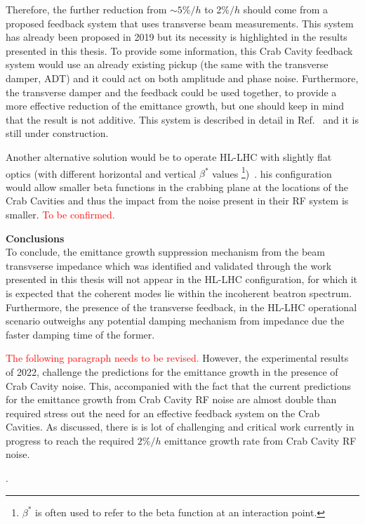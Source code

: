 Therefore, the further reduction from $\sim 5\%/h$ to 2$\%/h$ should come from a proposed feedback system that uses transverse beam measurements. This system has already been proposed in 2019 but its necessity is highlighted in the results presented in this thesis. To provide some information, this Crab Cavity feedback system would use an already existing pickup (the same with the transverse damper, ADT) and it could act on both amplitude and phase noise.  Furthermore, the transverse damper and the feedback could be used together, to provide a more effective reduction of the emittance growth, but one should keep in mind that the result is not additive. This system is described in detail in  Ref.~\cite{Baudrenghien:2665950} and it is still under construction. %

Another alternative solution would be to operate HL-LHC with slightly flat optics (with different horizontal and vertical $\beta^{\ast}$ values \footnote{$\beta^{\ast}$ is often used to refer to the beta function at an interaction point.})~\cite{elias_run4_op}. %
his configuration would allow smaller beta functions in the crabbing plane at the locations of the Crab Cavities and thus the impact from the noise present in their RF system is smaller.  \textcolor{red}{To be confirmed.}


\textbf{Conclusions}\\
To conclude, the emittance growth suppression mechanism from the beam transvserse impedance which was identified and validated through the work presented in this thesis will not appear in the HL-LHC configuration, for which it is expected that the coherent modes lie within the incoherent beatron spectrum. Furthermore, the presence of the transverse feedback, in the HL-LHC operational scenario outweighs any potential damping mechanism from impedance due the faster damping time of the former. 

\textcolor{red}{The following paragraph needs to be revised.}
However, the experimental results of 2022, challenge the predictions for the emittance growth in the presence of Crab Cavity noise. This, accompanied with the fact that the current predictions for the emittance growth from Crab Cavity RF noise are almost double than required stress out the need for an effective feedback system on the Crab Cavities. As discussed, there is is lot of challenging and critical work currently in progress to reach the required $2\%/h$ emittance growth rate from Crab Cavity RF noise.


.
